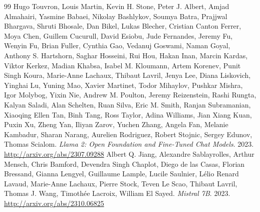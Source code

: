\documentclass[11pt]{article}
\begin{document}
\begin{thebibliography}{99}
 Hugo Touvron, Louis Martin, Kevin H. Stone, Peter J. Albert, Amjad Almahairi, Yasmine Babaei, Nikolay Bashlykov, Soumya Batra, Prajjwal Bhargava, Shruti Bhosale, Dan Bikel, Lukas Blecher, Cristian Canton Ferrer, Moya Chen, Guillem Cucurull, David Esiobu, Jude Fernandes, Jeremy Fu, Wenyin Fu, Brian Fuller, Cynthia Gao, Vedanuj Goswami, Naman Goyal, Anthony S. Hartshorn, Saghar Hosseini, Rui Hou, Hakan Inan, Marcin Kardas, Viktor Kerkez, Madian Khabsa, Isabel M. Kloumann, Artem Korenev, Punit Singh Koura, Marie-Anne Lachaux, Thibaut Lavril, Jenya Lee, Diana Liskovich, Yinghai Lu, Yuning Mao, Xavier Martinet, Todor Mihaylov, Pushkar Mishra, Igor Molybog, Yixin Nie, Andrew M. Poulton, Jeremy Reizenstein, Rashi Rungta, Kalyan Saladi, Alan Schelten, Ruan Silva, Eric M. Smith, Ranjan Subramanian, Xiaoqing Ellen Tan, Binh Tang, Ross Taylor, Adina Williams, Jian Xiang Kuan, Puxin Xu, Zheng Yan, Iliyan Zarov, Yuchen Zhang, Angela Fan, Melanie Kambadur, Sharan Narang, Aurelien Rodriguez, Robert Stojnic, Sergey Edunov, Thomas Scialom. \emph{Llama 2: Open Foundation and Fine-Tuned Chat Models}. 2023. \url{http://arxiv.org/abs/2307.09288}
 Albert Q. Jiang, Alexandre Sablayrolles, Arthur Mensch, Chris Bamford, Devendra Singh Chaplot, Diego de las Casas, Florian Bressand, Gianna Lengyel, Guillaume Lample, Lucile Saulnier, Lélio Renard Lavaud, Marie-Anne Lachaux, Pierre Stock, Teven Le Scao, Thibaut Lavril, Thomas J. Wang, Timothée Lacroix, William El Sayed. \emph{Mistral 7B}. 2023. \url{http://arxiv.org/abs/2310.06825}
\end{thebibliography}
\end{document}
